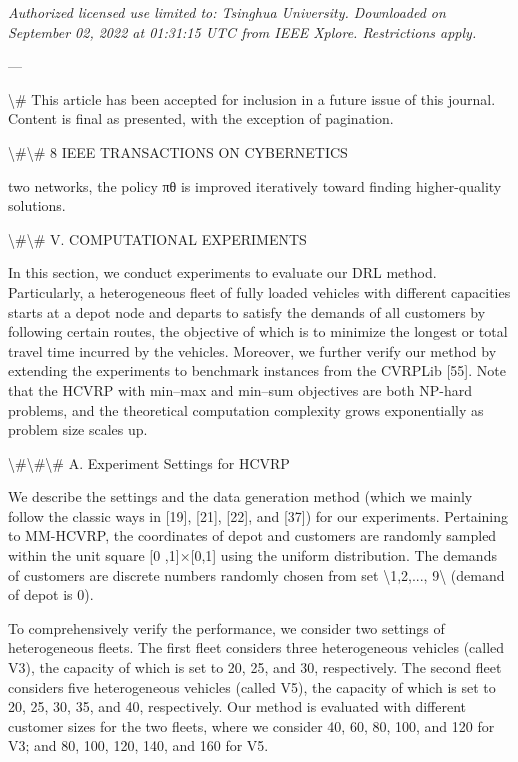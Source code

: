\documentclass{article}
\begin{document}
	\textit{Authorized licensed use limited to: Tsinghua University. Downloaded on September 02, 2022 at 01:31:15 UTC from IEEE Xplore. Restrictions apply.}
	
	---
	
	\textbackslash{}# This article has been accepted for inclusion in a future issue of this journal. Content is final as presented, with the exception of pagination.
	
	\textbackslash{}#\textbackslash{}# 8 IEEE TRANSACTIONS ON CYBERNETICS
	
	two networks, the policy πθ is improved iteratively toward finding higher-quality solutions.
	
	\textbackslash{}#\textbackslash{}# V. COMPUTATIONAL EXPERIMENTS
	
	In this section, we conduct experiments to evaluate our DRL method. Particularly, a heterogeneous fleet of fully loaded vehicles with different capacities starts at a depot node and departs to satisfy the demands of all customers by following certain routes, the objective of which is to minimize the longest or total travel time incurred by the vehicles. Moreover, we further verify our method by extending the experiments to benchmark instances from the CVRPLib [55]. Note that the HCVRP with min–max and min–sum objectives are both NP-hard problems, and the theoretical computation complexity grows exponentially as problem size scales up.
	
	\textbackslash{}#\textbackslash{}#\textbackslash{}# A. Experiment Settings for HCVRP
	
	We describe the settings and the data generation method (which we mainly follow the classic ways in [19], [21], [22], and [37]) for our experiments. Pertaining to MM-HCVRP, the coordinates of depot and customers are randomly sampled within the unit square [0 ,1]×[0,1] using the uniform distribution. The demands of customers are discrete numbers randomly chosen from set \textbackslash{}{1,2,..., 9\textbackslash{}} (demand of depot is 0).
	
	To comprehensively verify the performance, we consider two settings of heterogeneous fleets. The first fleet considers three heterogeneous vehicles (called V3), the capacity of which is set to 20, 25, and 30, respectively. The second fleet considers five heterogeneous vehicles (called V5), the capacity of which is set to 20, 25, 30, 35, and 40, respectively. Our method is evaluated with different customer sizes for the two fleets, where we consider 40, 60, 80, 100, and 120 for V3; and 80, 100, 120, 140, and 160 for V5.
	
\end{document}
